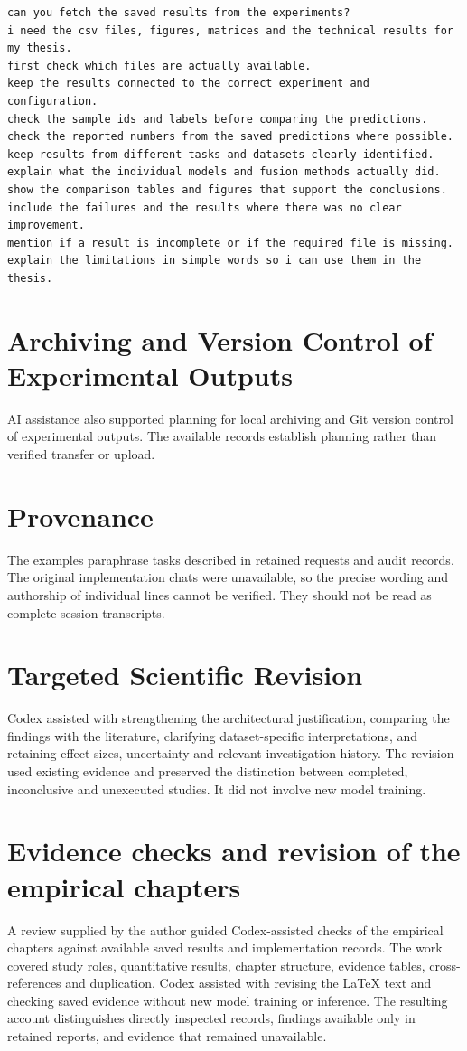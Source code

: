 \begingroup\singlespacing\footnotesize
\begin{verbatim}
can you fetch the saved results from the experiments?
i need the csv files, figures, matrices and the technical results for my thesis.
first check which files are actually available.
keep the results connected to the correct experiment and configuration.
check the sample ids and labels before comparing the predictions.
check the reported numbers from the saved predictions where possible.
keep results from different tasks and datasets clearly identified.
explain what the individual models and fusion methods actually did.
show the comparison tables and figures that support the conclusions.
include the failures and the results where there was no clear improvement.
mention if a result is incomplete or if the required file is missing.
explain the limitations in simple words so i can use them in the thesis.
\end{verbatim}
\endgroup

\section{Archiving and Version Control of Experimental Outputs}
\label{sec:results-archiving}
AI assistance also supported planning for local archiving and Git version control of
experimental outputs. The available records establish planning rather than verified
transfer or upload.

\section{Provenance}
The examples paraphrase tasks described in retained requests and audit records. The
original implementation chats were unavailable, so the precise wording and authorship of
individual lines cannot be verified. They should not be read as complete session
transcripts.

\section{Targeted Scientific Revision}
Codex assisted with strengthening the architectural justification, comparing the
findings with the literature, clarifying dataset-specific interpretations, and retaining
effect sizes, uncertainty and relevant investigation history. The revision used existing
evidence and preserved the distinction between completed, inconclusive and unexecuted
studies. It did not involve new model training.

\section{Evidence checks and revision of the empirical chapters}
A review supplied by the author guided Codex-assisted checks of the empirical chapters
against available saved results and implementation records. The work covered study
roles, quantitative results, chapter structure, evidence tables, cross-references and
duplication. Codex assisted with revising the LaTeX text and checking saved evidence
without new model training or inference. The resulting account distinguishes directly
inspected records, findings available only in retained reports, and evidence that
remained unavailable.
